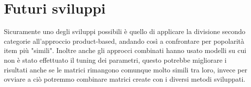 \section{Futuri sviluppi}
Sicuramente uno degli sviluppi possibili è quello di applicare la divisione secondo categorie all'approccio product-based, andando così a confrontare per popolarità item più "simili". Inoltre anche gli approcci combinati hanno usato modelli su cui non è stato effettuato il tuning dei parametri, questo potrebbe migliorare i risultati anche se le matrici rimangono comunque molto simili tra loro, invece per ovviare a ciò potremmo combinare matrici create con i diversi metodi sviluppati.